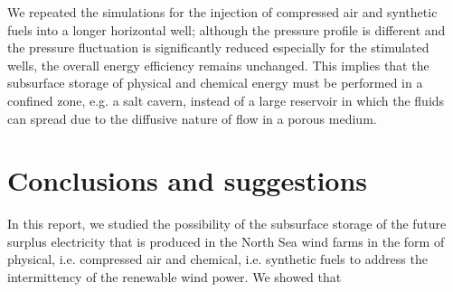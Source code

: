 \documentclass{ECOS_2021}
\begin{document}
We repeated the simulations for the injection of compressed air and
synthetic fuels into a longer horizontal well; although the pressure
profile is different and the pressure fluctuation is significantly
reduced especially for the stimulated wells, the overall energy efficiency
remains unchanged. This implies that the subsurface storage of physical
and chemical energy must be performed in a confined zone, e.g. a salt
cavern, instead of a large reservoir in which the fluids can spread
due to the diffusive nature of flow in a porous medium.

\sffamily \Large \section{Conclusions and suggestions}
\rmfamily \normalsize
In this report, we studied the possibility of the subsurface storage
of the future surplus electricity that is produced in the North Sea
wind farms in the form of physical, i.e. compressed air and chemical,
i.e. synthetic fuels to address the intermittency of the renewable
wind power. We showed that 
\end{document}
